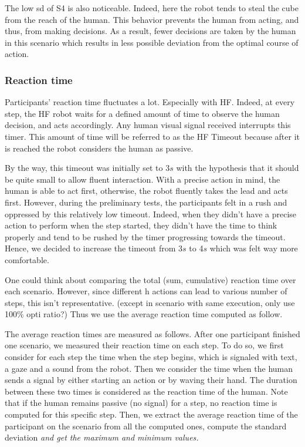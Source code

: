 The low sd of S4 is also noticeable. Indeed, here the robot tends to steal the cube from the reach of the human. This behavior prevents the human from acting, and thus, from making decisions. As a result, fewer decisions are taken by the human in this scenario which results in less possible deviation from the optimal course of action.

\subsubsection*{Reaction time}
Participants' reaction time fluctuates a lot. Especially with HF. Indeed, at every step, the HF robot waits for a defined amount of time to observe the human decision, and acts accordingly. Any human visual signal received interrupts this timer. This amount of time will be referred to as the HF Timeout because after it is reached the robot considers the human as passive.

By the way, this timeout was initially set to 3$s$ with the hypothesis that it should be quite small to allow fluent interaction. With a precise action in mind, the human is able to act first, otherwise, the robot fluently takes the lead and acts first. However, during the preliminary tests, the participants felt in a rush and oppressed by this relatively low timeout. Indeed, when they didn't have a precise action to perform when the step started, they didn't have the time to think properly and tend to be rushed by the timer progressing towards the timeout. Hence, we decided to increase the timeout from 3$s$ to 4$s$ which was felt way more comfortable. 



One could think about comparing the total (sum, cumulative) reaction time over each scenario. However, since different h actions can lead to various number of steps, this isn't representative. (except in scenario with same execution, only use 100\% opti ratio?) Thus we use the average reaction time computed as follow. 

The average reaction times are measured as follows. After one participant finished one scenario, we measured their reaction time on each step. To do so, we first consider for each step the time when the step begins, which is signaled with text, a gaze and a sound from the robot. Then we consider the time when the human sends a signal by either starting an action or by waving their hand. The duration between these two times is considered as the reaction time of the human. Note that if the human remains passive (no signal) for a step, no reaction time is computed for this specific step. Then, we extract the average reaction time of the participant on the scenario from all the computed ones, compute the standard deviation \textit{and get the maximum and minimum values.}

